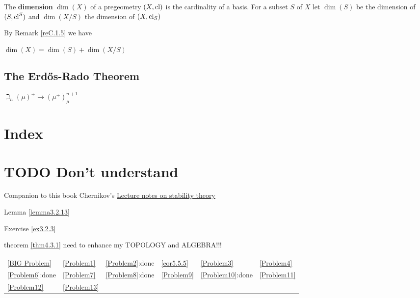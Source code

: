 \documentclass[11pt]{article}
\begin{document}
\begin{definition}[]
The \textbf{dimension} \(\dim(X)\) of a pregeometry \((X,\operatorname{\text{cl}})\) is the cardinality of a basis. For a
subset \(S\) of \(X\) let \(\dim(S)\) be the dimension of \((S,\operatorname{\text{cl}}^S)\) and \(\dim(X/S)\) the
dimension of \((X,\operatorname{\text{cl}}_S)\)
\end{definition}

By Remark \ref{reC.1.5} we have
\begin{lemma}[]
\label{lemmaC.1.8}
\(\dim(X)=\dim(S)+\dim(X/S)\)
\end{lemma}

\subsection{The Erdős-Rado Theorem}
\label{sec:org9a12371}
\begin{theorem}
\label{thmC.3.2}
\(\beth_n(\mu)^+\to(\mu^+)_\mu^{n+1}\)
\end{theorem}

\section{Index}
\label{sec:org78a60df}
\renewcommand{\indexname}{}
\printindex
\section{{\bfseries\sffamily TODO} Don't understand}
\label{sec:org5514ee1}
Companion to this book
Chernikov's \href{https://www.math.ucla.edu/\~chernikov/teaching/StabilityTheory285D/StabilityNotes.pdf}{Lecture notes on stability theory}

Lemma \ref{lemma3.2.13}

Exercise \ref{ex3.2.3}

theorem \ref{thm4.3.1} need to enhance my TOPOLOGY and ALGEBRA!!!

\begin{center}
\begin{tabular}{llllll}
\hline
\ref{BIG Problem} & \ref{Problem1} & \ref{Problem2}:done & \ref{cor5.5.5} & \ref{Problem3} & \ref{Problem4}\\
\ref{Problem6}:done & \ref{Problem7} & \ref{Problem8}:done & \ref{Problem9} & \ref{Problem10}:done & \ref{Problem11}\\
\ref{Problem12} & \ref{Problem13} &  &  &  & \\
\end{tabular}
\end{center}
\end{document}
